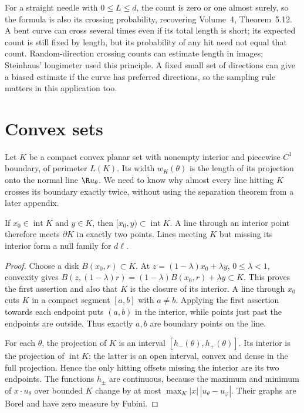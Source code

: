 For a straight needle with $0\le L\le d$, the count is zero or one almost surely, so the formula is also its crossing probability, recovering Volume~4, Theorem~5.12. A bent curve can cross several times even if its total length is short; its expected count is still fixed by length, but its probability of any hit need not equal that count. Random-direction crossing counts can estimate length in images; Steinhaus' longimeter used this principle. A fixed small set of directions can give a biased estimate if the curve has preferred directions, so the sampling rule matters in this application too.

\section{Convex sets}

Let $K$ be a compact convex planar set with nonempty interior and piecewise $C^1$ boundary, of perimeter $L(K)$. Its width $w_K(\theta)$ is the length of its projection onto the normal line $\R u_\theta$. We need to know why almost every line hitting $K$ crosses its boundary exactly twice, without using the separation theorem from a later appendix.

\begin{lemma}\label{lem:convexline}
If $x_0\in\operatorname{int}K$ and $y\in K$, then $[x_0,y)\subset\operatorname{int}K$. A line through an interior point therefore meets $\partial K$ in exactly two points. Lines meeting $K$ but missing its interior form a null family for $d\ell$.
\end{lemma}

\begin{proof}
Choose a disk $B(x_0,r)\subset K$. At $z=(1-\lambda)x_0+\lambda y$, $0\le\lambda<1$, convexity gives
$B(z,(1-\lambda)r)=(1-\lambda)B(x_0,r)+\lambda y\subset K$. This proves the first assertion and also that $K$ is the closure of its interior. A line through $x_0$ cuts $K$ in a compact segment $[a,b]$ with $a\ne b$. Applying the first assertion towards each endpoint puts $(a,b)$ in the interior, while points just past the endpoints are outside. Thus exactly $a,b$ are boundary points on the line.

For each $\theta$, the projection of $K$ is an interval $[h_-(\theta),h_+(\theta)]$. Its interior is the projection of $\operatorname{int}K$: the latter is an open interval, convex and dense in the full projection. Hence the only hitting offsets missing the interior are its two endpoints. The functions $h_\pm$ are continuous, because the maximum and minimum of $x\cdot u_\theta$ over bounded $K$ change by at most $\max_K|x|\,|u_\theta-u_\varphi|$. Their graphs are Borel and have zero measure by Fubini.
\end{proof}

